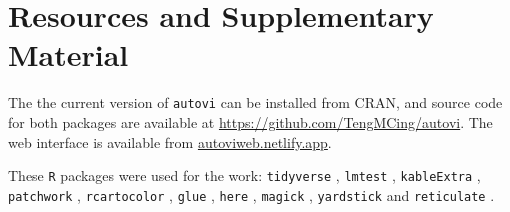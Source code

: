 \documentclass[
doublespace,
  times]{anzsauth}
\begin{document}
\section{Resources and Supplementary
Material}\label{resources-and-supplementary-material}

The the current version of \texttt{autovi} can be installed from CRAN,
and source code for both packages are available at
\url{https://github.com/TengMCing/autovi}. The web interface is
available from \url{autoviweb.netlify.app}.

These \texttt{R} packages were used for the work: \texttt{tidyverse}
\citep{tidyverse}, \texttt{lmtest} \citep{lmtest}, \texttt{kableExtra}
\citep{kableextra}, \texttt{patchwork} \citep{patchwork},
\texttt{rcartocolor} \citep{rcartocolor}, \texttt{glue} \citep{glue},
\texttt{here} \citep{here}, \texttt{magick} \citep{magick},
\texttt{yardstick} \citep{yardstick} and \texttt{reticulate}
\citep{reticulate}.


  
\end{document}
